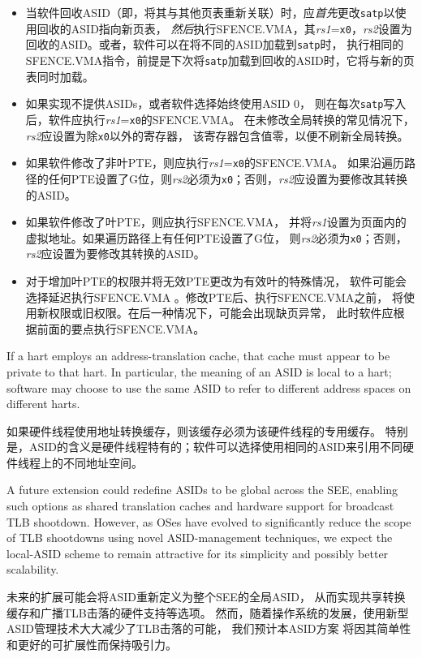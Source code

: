 \begin{commentary}
\begin{itemize}
\end{itemize}

\vspace{-0.1in}
\begin{itemize}

\item 当软件回收ASID（即，将其与其他页表重新关联）时，应{\em 首先}更改{\tt satp}以使用回收的ASID指向新页表，
{\em 然后}执行SFENCE.VMA，其{\em rs1}={\tt x0}，{\em rs2}设置为回收的ASID。或者，软件可以在将不同的ASID加载到{\tt satp}时，
执行相同的SFENCE.VMA指令，前提是下次将{\tt satp}加载到回收的ASID时，它将与新的页表同时加载。

\item 如果实现不提供ASIDs，或者软件选择始终使用ASID 0，
则在每次{\tt satp}写入后，软件应执行{\em rs1}={\tt x0}的SFENCE.VMA。
在未修改全局转换的常见情况下，{\em rs2}应设置为除{\tt x0}以外的寄存器，
该寄存器包含值零，以便不刷新全局转换。

\item 如果软件修改了非叶PTE，则应执行{\em rs1}={\tt x0}的SFENCE.VMA。
如果沿遍历路径的任何PTE设置了G位，则{\em rs2}必须为{\tt x0}；否则，{\em rs2}应设置为要修改其转换的ASID。

\item 如果软件修改了叶PTE，则应执行SFENCE.VMA，
并将{\em rs1}设置为页面内的虚拟地址。如果遍历路径上有任何PTE设置了G位，
则{\em rs2}必须为{\tt x0}；否则，{\em rs2}应设置为要修改其转换的ASID。

\item 对于增加叶PTE的权限并将无效PTE更改为有效叶的特殊情况，
软件可能会选择延迟执行SFENCE.VMA 。修改PTE后、执行SFENCE.VMA之前，
将使用新权限或旧权限。在后一种情况下，可能会出现缺页异常，
此时软件应根据前面的要点执行SFENCE.VMA。

\end{itemize}
\end{commentary}

If a hart employs an address-translation cache, that cache must appear to be
private to that hart.
In particular, the meaning of an ASID is local to a hart; software may choose
to use the same ASID to refer to different address spaces on different harts.

如果硬件线程使用地址转换缓存，则该缓存必须为该硬件线程的专用缓存。
特别是，ASID的含义是硬件线程特有的；软件可以选择使用相同的ASID来引用不同硬件线程上的不同地址空间。

\begin{commentary}
A future extension could redefine ASIDs to be global across the SEE, enabling
such options as shared translation caches and hardware support for broadcast
TLB shootdown.
However, as OSes have evolved to significantly reduce the scope of TLB
shootdowns using novel ASID-management techniques, we expect the local-ASID
scheme to remain attractive for its simplicity and possibly better
scalability.

未来的扩展可能会将ASID重新定义为整个SEE的全局ASID，
从而实现共享转换缓存和广播TLB击落的硬件支持等选项。
然而，随着操作系统的发展，使用新型ASID管理技术大大减少了TLB击落的可能，
我们预计本ASID方案 将因其简单性和更好的可扩展性而保持吸引力。
\end{commentary}


